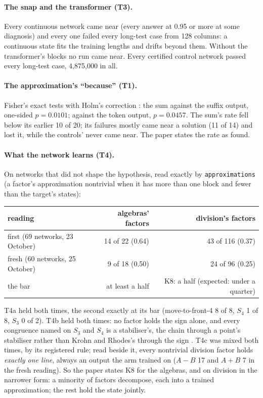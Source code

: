 \documentclass[11pt]{article}
\begin{document}
\paragraph{The snap and the transformer (T3).} Every continuous network came near (every answer at
0.95 or more at some diagnosis) and every one failed every long-test case from 128 columns: a
continuous state fits the training lengths and drifts beyond them. Without the transformer's blocks
no run came near. Every certified control network passed every long-test case, 4{,}875{,}000 in all.

\paragraph{The approximation's ``because'' (T1).} Fisher's exact tests \citep{fisher-1922-contingency}
with Holm's correction \citep{holm-1979-sequentially-rejective}: the sum against the suffix output,
one-sided $p = 0.0101$; against the token output, $p = 0.0457$. The sum's rate fell below its earlier
10 of 20; its failures mostly came near a solution (11 of 14) and lost it, while the controls' never
came near. The paper states the rate as found.

\paragraph{What the network learns (T4).} On networks that did not shape the hypothesis, read
exactly by \texttt{approximations} (a factor's approximation nontrivial when it has more than one
block and fewer than the target's states):

\begin{center}
\begin{tabular}{lrr}
\toprule
reading & algebras' factors & division's factors \\
\midrule
first (69 networks, 23 October) & 14 of 22 (0.64) & 43 of 116 (0.37) \\
fresh (60 networks, 25 October) & 9 of 18 (0.50) & 24 of 96 (0.25) \\
\midrule
the bar & at least a half & K8: a half (expected: under a quarter) \\
\bottomrule
\end{tabular}
\end{center}

T4a held both times, the second exactly at its bar (move-to-front-4 8 of 8, $S_4$ 1 of 8, $S_3$ 0
of 2). T4b held both times: no factor holds the sign alone, and every congruence named on $S_3$ and
$S_4$ is a stabiliser's, the chain through a point's stabiliser rather than Krohn and Rhodes's
through the sign \citep{krohn-rhodes-1965-algebraic-theory-machines}. T4c was mixed both times, by
its registered rule; read beside it, every nontrivial division factor holds \emph{exactly one line},
always an output the arm trained on ($A - B$ 17 and $A + B$ 7 in the fresh reading). So the paper
states K8 for the algebras, and on division in the narrower form: a minority of factors decompose,
each into a trained approximation; the rest hold the state jointly.
\end{document}
